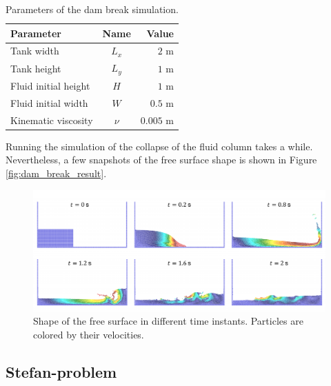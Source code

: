 \documentclass[a4paper,12pt,openany]{book}
\theoremstyle{break}
\begin{document}
\begin{table} [H]
\begin{center}
\caption{Parameters of the dam break simulation.}\label{tbl:dam_break_params}
\begin{tabular}{ l c r }
\toprule[1.5pt]
\bf Parameter & \bf Name & \bf Value \\
\midrule
Tank width & $L_x$ & $2$ m \\
Tank height & $L_y$ & $1$ m \\
Fluid initial height & $H$ & $1$ m \\
Fluid initial width & $W$ & $0.5$ m \\
Kinematic viscosity & $\nu$ & $0.005$ m \\
\bottomrule[1.25pt]
\end{tabular}
\end{center}
\end{table}
Running the simulation of the collapse of the fluid column takes a while. Nevertheless, a few snapshots of the free surface shape is shown in Figure \ref{fig:dam_break_result}. 
\begin{figure}[H]
  \includegraphics[scale=0.5]{dam_break_result.pdf}
  \centering
  \caption{Shape of the free surface in different time instants. Particles are colored by their velocities. }
  \label{fig:dam_break_results}
\end{figure}\vspace*{3pt}


\subsection{Stefan-problem}
\end{document}

